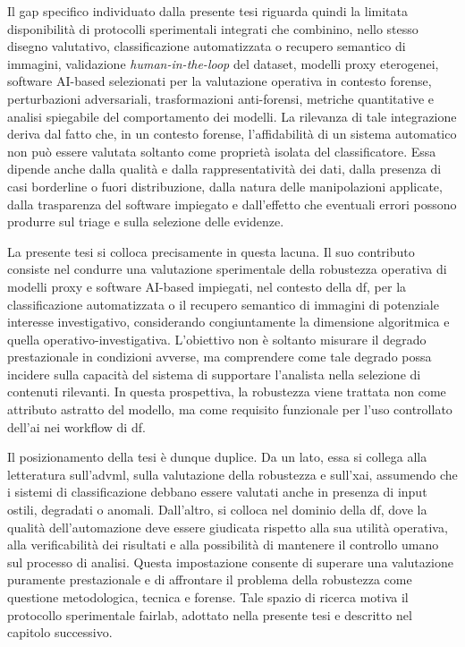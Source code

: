 Il gap specifico individuato dalla presente tesi riguarda quindi la limitata disponibilità di protocolli sperimentali integrati che combinino, nello stesso disegno valutativo, classificazione automatizzata o recupero semantico di immagini, validazione \textit{human-in-the-loop} del dataset, modelli proxy eterogenei, software AI-based selezionati per la valutazione operativa in contesto forense, perturbazioni adversariali, trasformazioni anti-forensi, metriche quantitative e analisi spiegabile del comportamento dei modelli. La rilevanza di tale integrazione deriva dal fatto che, in un contesto forense, l'affidabilità di un sistema automatico non può essere valutata soltanto come proprietà isolata del classificatore. Essa dipende anche dalla qualità e dalla rappresentatività dei dati, dalla presenza di casi borderline o fuori distribuzione, dalla natura delle manipolazioni applicate, dalla trasparenza del software impiegato e dall'effetto che eventuali errori possono produrre sul triage e sulla selezione delle evidenze.

La presente tesi si colloca precisamente in questa lacuna. Il suo contributo consiste nel condurre una valutazione sperimentale della robustezza operativa di modelli proxy e software AI-based impiegati, nel contesto della \gls{df}, per la classificazione automatizzata o il recupero semantico di immagini di potenziale interesse investigativo, considerando congiuntamente la dimensione algoritmica e quella operativo-investigativa. L'obiettivo non è soltanto misurare il degrado prestazionale in condizioni avverse, ma comprendere come tale degrado possa incidere sulla capacità del sistema di supportare l'analista nella selezione di contenuti rilevanti. In questa prospettiva, la robustezza viene trattata non come attributo astratto del modello, ma come requisito funzionale per l'uso controllato dell'\gls{ai} nei workflow di \gls{df}.

Il posizionamento della tesi è dunque duplice. Da un lato, essa si collega alla letteratura sull'\gls{advml}, sulla valutazione della robustezza e sull'\gls{xai}, assumendo che i sistemi di classificazione debbano essere valutati anche in presenza di input ostili, degradati o anomali. Dall'altro, si colloca nel dominio della \gls{df}, dove la qualità dell'automazione deve essere giudicata rispetto alla sua utilità operativa, alla verificabilità dei risultati e alla possibilità di mantenere il controllo umano sul processo di analisi. Questa impostazione consente di superare una valutazione puramente prestazionale e di affrontare il problema della robustezza come questione metodologica, tecnica e forense. Tale spazio di ricerca motiva il protocollo sperimentale \gls{fairlab}, adottato nella presente tesi e descritto nel capitolo successivo.